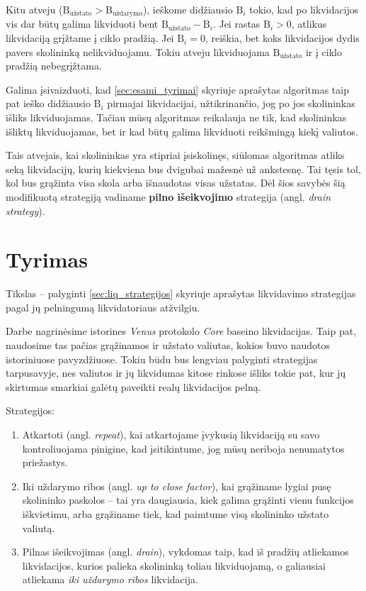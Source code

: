 \documentclass{VUMIFPSkursinis}
\begin{document}
Kitu atveju ($\text{B}_{\text{užstato}} > \text{B}_{\text{uždarymo}}$), ieškome didžiausio $\text{B}_{i}$ tokio, kad po likvidacijos vis dar būtų galima likviduoti bent $\text{B}_{\text{užstato}} - \text{B}_{i}$. Jei rastas $\text{B}_{i} > 0$, atlikus likvidaciją grįžtame į ciklo pradžią. Jei $\text{B}_{i} = 0$, reiškia, bet koks likvidacijos dydis pavers skolininką nelikviduojamu. Tokiu atveju likviduojama $\text{B}_{\text{užstato}}$ ir į ciklo pradžią nebegrįžtama.

Galima įsivaizduoti, kad \ref{sec:esami_tyrimai} skyriuje aprašytas algoritmas taip pat ieško didžiausio $\text{B}_{i}$ pirmajai likvidacijai, užtikrinančio, jog po jos skolininkas išliks likviduojamas. Tačiau mūsų algoritmas reikalauja ne tik, kad skolininkas išliktų likviduojamas, bet ir kad būtų galima likviduoti reikšmingą kiekį valiutos.

Tais atvejais, kai skolininkas yra stipriai įsiskolinęs, siūlomas algoritmas atliks seką likvidacijų, kurių kiekviena bus dvigubai mažesnė už ankstesnę. Tai tęsis tol, kol bus grąžinta visa skola arba išnaudotas visas užstatas. Dėl šios savybės šią modifikuotą strategiją vadiname \textbf{pilno išeikvojimo} strategija (angl. \textit{drain strategy}).

\section{Tyrimas}

Tikslas – palyginti \ref{sec:liq_strategijos} skyriuje aprašytas likvidavimo strategijas pagal jų pelningumą likvidatoriaus atžvilgiu.

Darbe nagrinėsime istorines \textit{\textit{Venus}} protokolo \textit{Core} baseino likvidacijas. Taip pat, naudosime tas pačias grąžinamos ir užstato valiutas, kokios buvo naudotos istoriniuose pavyzdžiuose. Tokiu būdu bus lengviau palyginti strategijas tarpusavyje, nes valiutos ir jų likvidumas kitose rinkose išliks tokie pat, kur jų skirtumas smarkiai galėtų paveikti realų likvidacijos pelną.

Strategijos:
\begin{enumerate}[label=\arabic*.]
  \item Atkartoti (angl. \textit{repeat}), kai atkartojame įvykusią likvidaciją su savo kontroliuojama pinigine, kad įsitikintume, jog mūsų neriboja nenumatytos priežastys.
  \item Iki uždarymo ribos (angl. \textit{up to close factor}), kai grąžiname lygiai pusę skolininko paskolos – tai yra daugiausia, kiek galima grąžinti vienu funkcijos iškvietimu, arba grąžiname tiek, kad paimtume visą skolininko užstato valiutą.
  \item Pilnas išeikvojimas (angl. \textit{drain}), vykdomas taip, kad iš pradžių atliekamos likvidacijos, kurios palieka skolininką toliau likviduojamą, o galiausiai atliekama \textit{iki uždarymo ribos} likvidacija.
\end{enumerate}
\end{document}
